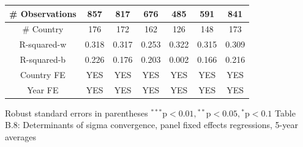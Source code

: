 \documentclass[10pt]{article}
\begin{document}
\begin{center}
\begin{tabular}{|c|c|c|c|c|c|c|}
\hline
\# Observations & 857 & 817 & 676 & 485 & 591 & 841 \\
\hline
\# Country & 176 & 172 & 162 & 126 & 148 & 173 \\
\hline
R-squared-w & 0.318 & 0.317 & 0.253 & 0.322 & 0.315 & 0.309 \\
\hline
R-squared-b & 0.226 & 0.176 & 0.203 & 0.002 & 0.166 & 0.216 \\
\hline
Country FE & YES & YES & YES & YES & YES & YES \\
\hline
Year FE & YES & YES & YES & YES & YES & YES \\
\hline
\end{tabular}
\end{center}

Robust standard errors in parentheses ${ }^{* * *} \mathrm{p}<0.01,{ }^{* *} \mathrm{p}<0.05,{ }^{*} \mathrm{p}<0.1$ Table B.8: Determinants of sigma convergence, panel fixed effects regressions, 5-year averages
\end{document}
